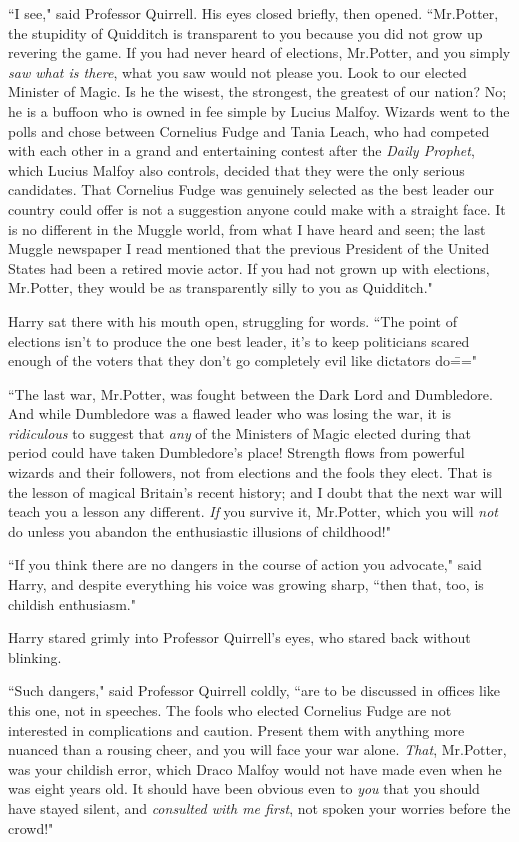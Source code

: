 ``I see," said Professor Quirrell. His eyes closed briefly, then opened. ``Mr.\?Potter, the stupidity of Quidditch is transparent to you because you did not grow up revering the game. If you had never heard of elections, Mr.\?Potter, and you simply \emph{saw what is there}, what you saw would not please you. Look to our elected Minister of Magic. Is he the wisest, the strongest, the greatest of our nation? No; he is a buffoon who is owned in fee simple by Lucius Malfoy. Wizards went to the polls and chose between Cornelius Fudge and Tania Leach, who had competed with each other in a grand and entertaining contest after the \emph{Daily Prophet}, which Lucius Malfoy also controls, decided that they were the only serious candidates. That Cornelius Fudge was genuinely selected as the best leader our country could offer is not a suggestion anyone could make with a straight face. It is no different in the Muggle world, from what I have heard and seen; the last Muggle newspaper I read mentioned that the previous President of the United States had been a retired movie actor. If you had not grown up with elections, Mr.\?Potter, they would be as transparently silly to you as Quidditch."

Harry sat there with his mouth open, struggling for words. ``The point of elections isn't to produce the one best leader, it's to keep politicians scared enough of the voters that they don't go completely evil like dictators do\==="

``The last war, Mr.\?Potter, was fought between the Dark Lord and Dumbledore. And while Dumbledore was a flawed leader who was losing the war, it is \emph{ridiculous} to suggest that \emph{any} of the Ministers of Magic elected during that period could have taken Dumbledore's place! Strength flows from powerful wizards and their followers, not from elections and the fools they elect. That is the lesson of magical Britain's recent history; and I doubt that the next war will teach you a lesson any different. \emph{If} you survive it, Mr.\?Potter, which you will \emph{not} do unless you abandon the enthusiastic illusions of childhood!"

``If you think there are no dangers in the course of action you advocate," said Harry, and despite everything his voice was growing sharp, ``then that, too, is childish enthusiasm."

Harry stared grimly into Professor Quirrell's eyes, who stared back without blinking.

``Such dangers," said Professor Quirrell coldly, ``are to be discussed in offices like this one, not in speeches. The fools who elected Cornelius Fudge are not interested in complications and caution. Present them with anything more nuanced than a rousing cheer, and you will face your war alone. \emph{That}, Mr.\?Potter, was your childish error, which Draco Malfoy would not have made even when he was eight years old. It should have been obvious even to \emph{you} that you should have stayed silent, and \emph{consulted with me first}, not spoken your worries before the crowd!"

